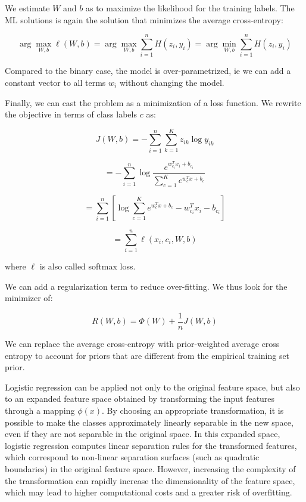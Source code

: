 We estimate $W$ and $b$ as to maximize the likelihood for the training labels. The ML solutions is again the solution that minimizes the average cross-entropy:


\begin{equation*}
\arg\max_{W, b} \ell(W, b) = \arg\max_{W, b} \sum_{i=1}^n H(z_i, y_i) = \arg\min_{W, b} \sum_{i=1}^n H(z_i, y_i)
\end{equation*}

Compared to the binary case, the model is over-parametrized, ie we can add a constant vector to all terms $w_i$ without changing the model.

Finally, we can cast the problem as a minimization of a loss function. We rewrite the objective in terms of class labels $c$ as:


\begin{equation*}
J(W, b) = -\sum_{i=1}^n \sum_{k=1}^K z_{ik} \log y_{ik}
\end{equation*}


\begin{equation*}
= -\sum_{i=1}^n \log \frac{e^{w_{c_i}^T x_i + b_{c_i}}}{\sum_{c=1}^K e^{w_c^T x + b_c}}
\end{equation*}


\begin{equation*}
= \sum_{i=1}^n [\log \sum_{c=1}^K e^{w_c^T x + b_c} - w_{c_i}^T x_i - b_{c_i}]
\end{equation*}


\begin{equation*}
= \sum_{i=1}^n \ell(x_i, c_i, W, b)
\end{equation*}

where $\ell$ is also called softmax loss.

We can add a regularization term to reduce over-fitting. We thus look for the minimizer of:


\begin{equation*}
R(W, b) = \Phi(W) + \frac{1}{n} J(W, b)
\end{equation*}

We can replace the average cross-entropy with prior-weighted average cross entropy to account for priors that are different from the empirical training set prior.

Logistic regression can be applied not only to the original feature space, but also to an expanded feature space obtained by transforming the input features through a mapping $\phi(x)$. By choosing an appropriate transformation, it is possible to make the classes approximately linearly separable in the new space, even if they are not separable in the original space. In this expanded space, logistic regression computes linear separation rules for the transformed features, which correspond to non-linear separation surfaces (such as quadratic boundaries) in the original feature space. However, increasing the complexity of the transformation can rapidly increase the dimensionality of the feature space, which may lead to higher computational costs and a greater risk of overfitting.

